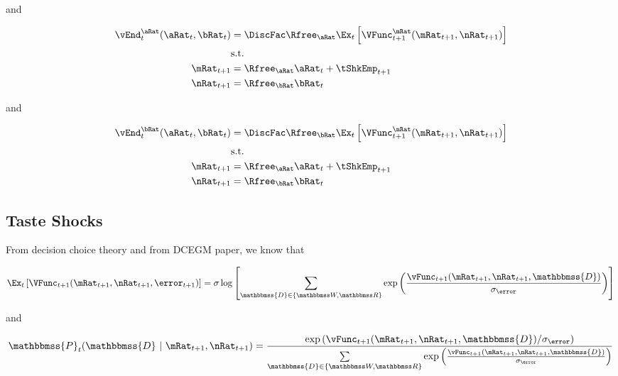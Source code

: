 \documentclass[\econtexRoot/EGMN]{subfiles}
\begin{document}
and

\begin{equation}
  \begin{split}
    \vEnd_{t}^{\aRat}(\aRat_{t}, \bRat_{t}) & =  \DiscFac
    \Rfree_{\aRat} \Ex_{t} \left[ \VFunc^{\mRat}_{t+1}(\mRat_{t+1},
      \nRat_{t+1})
      \right] \\
    & \text{s.t.} \\
    \mRat_{t+1} & = \Rfree_{\aRat} \aRat_{t} + \tShkEmp_{t+1} \\
    \nRat_{t+1} & = \Rfree_{\bRat} \bRat_{t}
  \end{split}
\end{equation}

and

\begin{equation}
  \begin{split}
    \vEnd_{t}^{\bRat}(\aRat_{t}, \bRat_{t}) & =  \DiscFac
    \Rfree_{\bRat} \Ex_{t} \left[ \VFunc^{\nRat}_{t+1}(\mRat_{t+1},
      \nRat_{t+1})
      \right] \\
    & \text{s.t.} \\
    \mRat_{t+1} & = \Rfree_{\aRat} \aRat_{t} + \tShkEmp_{t+1} \\
    \nRat_{t+1} & = \Rfree_{\bRat} \bRat_{t}
  \end{split}
\end{equation}

\subsection{Taste Shocks}

From decision choice theory and from DCEGM paper, we know that

\providecommand{\Decision}{\ensuremath{\mathbbmss{D}}}

\begin{equation}
  \Ex_{t} \left[
    \VFunc_{t+1}(\mRat_{t+1}, \nRat_{t+1}, \error_{t+1}) \right] =
  \sigma \log \left[ \sum_{\Decision \in \{\Work, \Retire\}} \exp \left(
    \frac{\vFunc_{t+1}(\mRat_{t+1}, \nRat_{t+1},
      \Decision)}{\sigma_\error}	\right) 	\right]
\end{equation}

and

\providecommand{\Prob}{\ensuremath{\mathbbmss{P}}}

\begin{equation}
  \Prob_{t}(\Decision ~ \lvert ~ \mRat_{t+1}, \nRat_{t+1}) = \frac{\exp
    \left(
    \vFunc_{t + 1}(\mRat_{t+1}, \nRat_{t+1}, \Decision) /
    \sigma_\error
    \right)
  }{  \sum\limits_{\Decision \in \{\Work, \Retire\}}	\exp \left(
    \frac{\vFunc_{t+1}(\mRat_{t+1}, \nRat_{t+1},
      \Decision)}{\sigma_\error}	\right)}
\end{equation}
\end{document}
